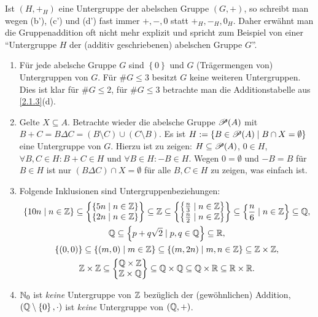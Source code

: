 \documentclass[../../main.tex]{subfiles}
\begin{document}
\begin{bem}\label{2.2.3}
Ist $(H,+_H)$ eine Untergruppe der abelschen Gruppe $(G,+)$, so schreibt man wegen (b'), (c') und (d') fast immer $+,-,0$ statt $+_H,-_H,0_H$. Daher erwähnt man die Gruppenaddition oft nicht mehr explizit und spricht zum Beispiel von einer "`Untergruppe $H$ der (additiv geschriebenen) abelschen Gruppe $G$"'.
\end{bem}

\begin{bsp}\label{2.2.4}
\begin{enumerate}[\normalfont(a)]
\item Für jede abelsche Gruppe $G$ sind $\left\{0\right\}$ und $G$ (Trägermengen von) Untergruppen von $G$.
Für $\# G\leq 3$ besitzt $G$ keine weiteren Untergruppen.
Dies ist klar für $\#G\le2$, für $\#G\le3$ betrachte man die Additionstabelle aus \ref{2.1.3}(d).
\item Gelte $X\subseteq A$. Betrachte wieder die abelsche Gruppe $\mathcal P(A)$ mit $B+C=B\Delta C=(B\setminus C)\cup (C\setminus B)$. Es ist $H:=\left\{B\in\mathcal P(A)\mid B\cap X=\emptyset\right\}$ eine Untergruppe von $G$.
Hierzu ist zu zeigen: $H\subseteq\mathcal P(A)$, $0\in H$, $\forall B,C\in H:B+C\in H$ und $\forall B\in H:-B\in H$.
Wegen $0=\emptyset$ und $-B=B$ für $B\in H$ ist nur $(B\Delta C)\cap X=\emptyset$ für alle $B,C\in H$ zu zeigen, was
einfach ist.
\item Folgende Inklusionen sind Untergruppenbeziehungen:
\begin{gather*}
\left\{10n\mid n\in\mathbb Z\right\}\subseteq\begin{Bmatrix}\left\{5n\mid n\in \mathbb Z\right\}\\\left\{2n\mid n\in \mathbb Z\right\}\end{Bmatrix}\subseteq \mathbb Z\subseteq\begin{Bmatrix}\left\{\frac{n}{3}\mid n\in \mathbb Z\right\}\\\left\{\frac{n}{2}\mid n\in \mathbb Z\right\}\end{Bmatrix}\subseteq\left\{\frac{n}{6}\mid n\in \mathbb Z\right\}\subseteq \mathbb Q,\\
\mathbb Q\subseteq\left\{p+q\sqrt{2}\mid p,q\in\mathbb Q\right\}\subseteq\mathbb R,\\
\{(0,0)\}\subseteq\{(m,0)\mid m\in\mathbb Z\}\subseteq\{(m,2n)\mid m,n\in\mathbb Z\}\subseteq\mathbb Z\times\mathbb Z,\\
\mathbb Z\times\mathbb Z\subseteq\begin{Bmatrix}\mathbb Q\times\mathbb Z\\\mathbb Z\times\mathbb Q\end{Bmatrix}\subseteq\mathbb Q\times\mathbb Q\subseteq \mathbb Q\times\mathbb R\subseteq\mathbb R\times\mathbb R.
\end{gather*}
\item $\mathbb N_0$ ist \emph{keine} Untergruppe von $\mathbb Z$ bezüglich der (gewöhnlichen) Addition,
$(\mathbb Q\setminus \left\{0\right\},\cdot)$ ist \emph{keine} Untergruppe von $(\mathbb Q,+)$.
\end{enumerate}
\end{bsp}
\end{document}
